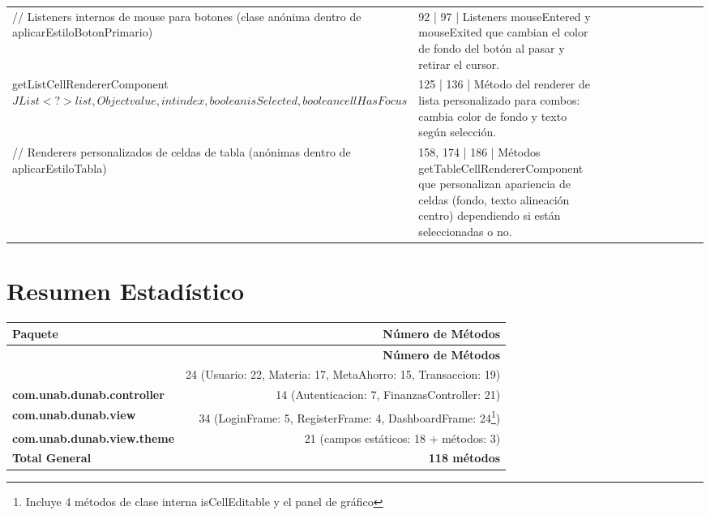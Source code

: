 \documentclass[utf8]{article}
\begin{document}
\begin{longtable}{p{0.18\linewidth}p{0.32\linewidth}p{0.5\linewidth}}
// Listeners internos de mouse para botones (clase anónima dentro de aplicarEstiloBotonPrimario) & 92 | 97 | Listeners mouseEntered y mouseExited que cambian el color de fondo del botón al pasar y retirar el cursor. \\
getListCellRendererComponent\(JList<?> list, Object value, int index, boolean isSelected, boolean cellHasFocus\) & 125 | 136 | Método del renderer de lista personalizado para combos: cambia color de fondo y texto según selección. \\
// Renderers personalizados de celdas de tabla (anónimas dentro de aplicarEstiloTabla) & 158, 174 | 186 | Métodos getTableCellRendererComponent que personalizan apariencia de celdas (fondo, texto alineación centro) dependiendo si están seleccionadas o no. \\
\end{longtable}

\section*{Resumen Estadístico}

\begin{longtable}{lr}
\hline
\textbf{Paquete} & \textbf{Número de Métodos} \\ \hline
\endfirsthead}
\hline
\textbf{Paquete} & \textbf{Número de Métodos} \\ \hline
\endhead}
\hline
\textbf{com.unab.dunab.model} & 24 (Usuario: 22, Materia: 17, MetaAhorro: 15, Transaccion: 19) \\ \hline
\textbf{com.unab.dunab.controller} & 14 (Autenticacion: 7, FinanzasController: 21) \\ \hline
\textbf{com.unab.dunab.view} & 34 (LoginFrame: 5, RegisterFrame: 4, DashboardFrame: 24\footnote{Incluye 4 métodos de clase interna isCellEditable y el panel de gráfico}) \\ \hline
\textbf{com.unab.dunab.view.theme} & 21 (campos estáticos: 18 + métodos: 3) \\ \hline
\textbf{Total General} & \textbf{118 métodos} \\ \hline
\end{longtable}
\end{document}

